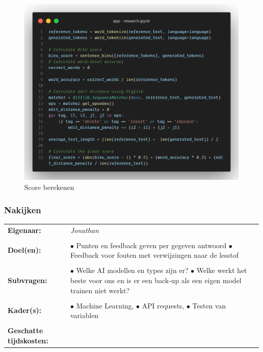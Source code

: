 \documentclass[12pt]{article}
\begin{document}
\begin{minipage}{0.5\linewidth}
\begin{figure}[H]
    \centering
    \includegraphics[width=\linewidth]{./images/methoden/inscannen/score/code-score.png}
    \caption{Score berekenen}
    \label{fig:score-calc-code}
\end{figure}
\end{minipage}

\pagebreak

\subsubsection{Nakijken}
\noindent\begin{tabularx}{\linewidth}{ll}
    \textbf{Eigenaar: } & \textit{Jonathan} \\ \\
    \textbf{Doel(en): } & 
        \makecell[tl]{
            $\bullet$ Punten en feedback geven per gegeven antwoord \\
            $\bullet$ Feedback voor fouten met verwijzingen naar de lesstof
        } \\ \\
    \textbf{Subvragen: } & 
        \makecell[tl]{
            $\bullet$ Welke AI modellen en types zijn er? \\
            $\bullet$ Welke werkt het beste voor ons en is er een back-up als een eigen model\\ trainen niet werkt?
        } \\ \\
    \textbf{Kader(s): } & 
        \makecell[tl]{
            $\bullet$ Machine Learning, \\
            $\bullet$ API requests, \\
            $\bullet$ Testen van variablen
        } \\ \\
    \parbox[t]{3cm}{\raggedright\textbf{Geschatte tijdskosten:} } &   \\
\end{tabularx}
\end{document}
